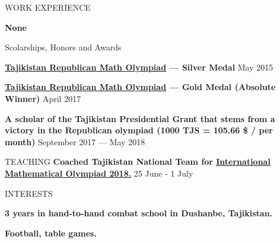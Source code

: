 \documentclass{resume}
\begin{document}



\begin{rSection}{WORK EXPERIENCE} \itemsep -1pt {}  

\item \textbf{None}

\end{rSection}

\begin{rSection}{Scolarships, Honors and Awards} \itemsep -1pt {}  

\item \textbf{\href{http://mri.tj/?page_id=124}{\underline{Tajikistan Republican Math Olympiad}} --- Silver Medal} \hfill May 2015
\item \textbf{\href{http://mri.tj/?page_id=124}{\underline{Tajikistan Republican Math Olympiad}} --- Gold Medal (Absolute Winner)} \hfill April 2017
\item {\textbf{A scholar of the Tajikistan Presidential Grant that stems from a victory in the Republican olympiad (1000 TJS = 105.66 \$ / per month)}} \hfill September 2017 --- May 2018
\end{rSection}

\begin{rSection}{TEACHING}
\textbf{Coached Tajikistan National Team for \href{https://www.imo-official.org/country_individual_r.aspx?code=TJK}{\underline{International Mathematical Olympiad 2018.}}} \hfill 25 June - 1 July

\end{rSection}

\begin{rSection}{INTERESTS}
\item \textbf{3 years in hand-to-hand combat school in Dushanbe, Tajikistan.}
\item \textbf{Football,  table games.}
\end{rSection}
\end{document}
